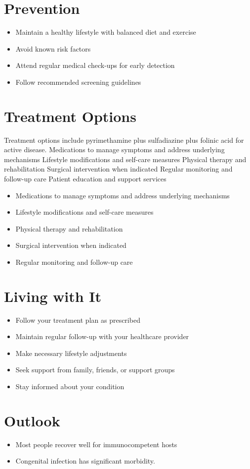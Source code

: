\section{Prevention}
\begin{itemize}[noitemsep]
  \item Maintain a healthy lifestyle with balanced diet and exercise
  \item Avoid known risk factors
  \item Attend regular medical check-ups for early detection
  \item Follow recommended screening guidelines
\end{itemize}
\section{Treatment Options}
Treatment options include pyrimethamine plus sulfadiazine plus folinic acid for active disease. Medications to manage symptoms and address underlying mechanisms Lifestyle modifications and self-care measures Physical therapy and rehabilitation Surgical intervention when indicated Regular monitoring and follow-up care Patient education and support services

\begin{itemize}[noitemsep]
  \item Medications to manage symptoms and address underlying mechanisms
  \item Lifestyle modifications and self-care measures
  \item Physical therapy and rehabilitation
  \item Surgical intervention when indicated
  \item Regular monitoring and follow-up care
\end{itemize}
\section{Living with It}
\begin{itemize}[noitemsep]
  \item Follow your treatment plan as prescribed
  \item Maintain regular follow-up with your healthcare provider
  \item Make necessary lifestyle adjustments
  \item Seek support from family, friends, or support groups
  \item Stay informed about your condition
\end{itemize}
\section{Outlook}
\begin{itemize}[noitemsep]
  \item Most people recover well for immunocompetent hosts
  \item Congenital infection has significant morbidity.
\end{itemize}
